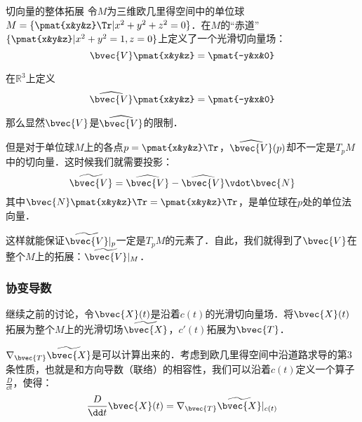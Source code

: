 \begin{example}{切向量的整体拓展}
令$M$为三维欧几里得空间中的单位球$M=\{\pmat{x&y&z}\Tr|x^2+y^2+z^2=0\}$．在$M$的“赤道”$\{\pmat{x&y&z}|x^2+y^2=1, z=0\}$上定义了一个光滑切向量场：
\begin{equation}
\bvec{V}\pmat{x&y&z}=\pmat{-y&x&0}
\end{equation}

在$\mathbb{R}^3$上定义
\begin{equation}
\widehat{\bvec{V}}\pmat{x&y&z}=\pmat{-y&x&0}
\end{equation}

那么显然$\bvec{V}$是$\widehat{\bvec{V}}$的限制．

但是对于单位球$M$上的各点$p=\pmat{x&y&z}\Tr$，$\widehat{\bvec{V}}(p)$却不一定是$T_pM$中的切向量．这时候我们就需要投影：
\begin{equation}
\widetilde{\bvec{V}}=\widehat{\bvec{V}}-\widehat{\bvec{V}}\vdot\bvec{N}
\end{equation}
其中$\bvec{N}\pmat{x&y&z}\Tr=\pmat{x&y&z}\Tr$，是单位球在$p$处的单位法向量．

这样就能保证$\widetilde{\bvec{V}}|_p$一定是$T_pM$的元素了．自此，我们就得到了$\bvec{V}$在整个$M$上的拓展：$\widetilde{\bvec{V}}|_{M}$．

\end{example}

\subsubsection{协变导数}

继续之前的讨论，令$\bvec{X}(t)$是沿着$c(t)$的光滑切向量场．将$\bvec{X}(t)$拓展为整个$M$上的光滑切场$\widetilde{\bvec{X}}$，$c'(t)$拓展为$\bvec{T}$．

$\nabla_{\bvec{T}}\widetilde{\bvec{X}}$是可以计算出来的．考虑到欧几里得空间中沿道路求导的第3条性质，也就是和方向导数（联络）的相容性，我们可以沿着$c(t)$定义一个算子$\frac{D}{\dd t}$，使得：
\begin{equation}
\frac{D}{\dd t}\bvec{X}(t)=\nabla_{\bvec{T}}\widetilde{\bvec{X}}|_{c(t)}
\end{equation}












